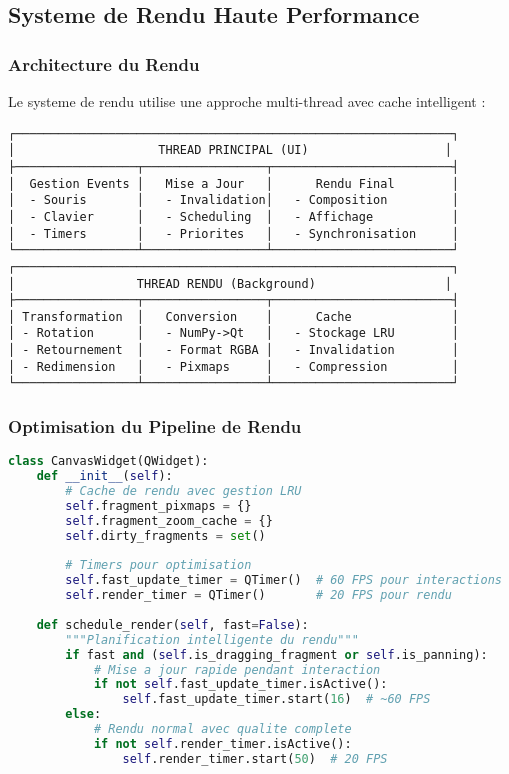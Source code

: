 \documentclass[12pt,a4paper]{article}
\begin{document}
\subsection{Systeme de Rendu Haute Performance}

\subsubsection{Architecture du Rendu}

Le systeme de rendu utilise une approche multi-thread avec cache intelligent :

\begin{verbatim}
┌─────────────────────────────────────────────────────────────┐
│                    THREAD PRINCIPAL (UI)                   │
├─────────────────┬─────────────────┬─────────────────────────┤
│  Gestion Events │   Mise a Jour   │      Rendu Final        │
│  - Souris       │   - Invalidation│   - Composition         │
│  - Clavier      │   - Scheduling  │   - Affichage           │
│  - Timers       │   - Priorites   │   - Synchronisation     │
└─────────────────┴─────────────────┴─────────────────────────┘
┌─────────────────────────────────────────────────────────────┐
│                 THREAD RENDU (Background)                  │
├─────────────────┬─────────────────┬─────────────────────────┤
│ Transformation  │   Conversion    │      Cache              │
│ - Rotation      │   - NumPy->Qt   │   - Stockage LRU        │
│ - Retournement  │   - Format RGBA │   - Invalidation        │
│ - Redimension   │   - Pixmaps     │   - Compression         │
└─────────────────┴─────────────────┴─────────────────────────┘
\end{verbatim}

\subsubsection{Optimisation du Pipeline de Rendu}

\begin{lstlisting}[language=Python]
class CanvasWidget(QWidget):
    def __init__(self):
        # Cache de rendu avec gestion LRU
        self.fragment_pixmaps = {}
        self.fragment_zoom_cache = {}
        self.dirty_fragments = set()
        
        # Timers pour optimisation
        self.fast_update_timer = QTimer()  # 60 FPS pour interactions
        self.render_timer = QTimer()       # 20 FPS pour rendu
        
    def schedule_render(self, fast=False):
        """Planification intelligente du rendu"""
        if fast and (self.is_dragging_fragment or self.is_panning):
            # Mise a jour rapide pendant interaction
            if not self.fast_update_timer.isActive():
                self.fast_update_timer.start(16)  # ~60 FPS
        else:
            # Rendu normal avec qualite complete
            if not self.render_timer.isActive():
                self.render_timer.start(50)  # 20 FPS
\end{lstlisting}
\end{document}
